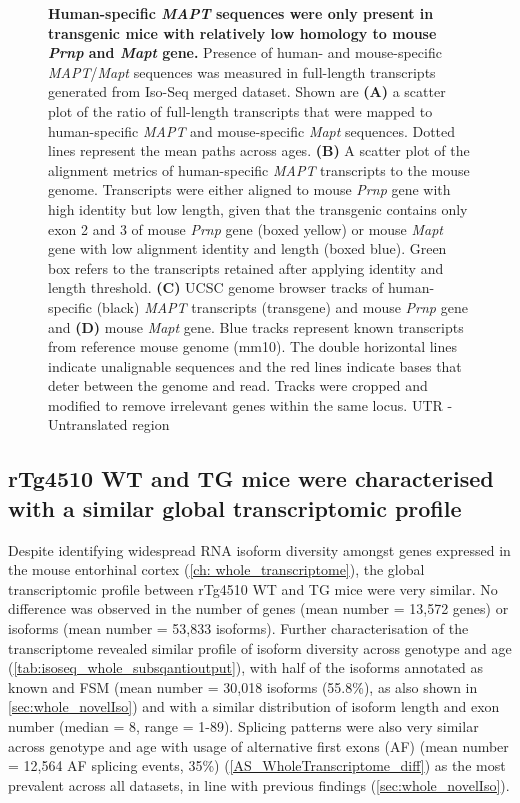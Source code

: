 \begin{figure}[htp]
	{\textbf{Human-specific \textit{MAPT} sequences were only present in transgenic mice with relatively low homology to mouse \textit{Prnp} and \textit{Mapt} gene.} Presence of human- and mouse-specific \textit{MAPT}/\textit{Mapt} sequences was measured in full-length transcripts generated from Iso-Seq merged dataset. Shown are \textbf{(A)} a scatter plot of the ratio of full-length transcripts that were mapped to human-specific \textit{MAPT} and mouse-specific \textit{Mapt} sequences. Dotted lines represent the mean paths across ages. \textbf{(B)} A scatter plot of the alignment metrics of human-specific \textit{MAPT} transcripts to the mouse genome. Transcripts were either aligned to mouse \textit{Prnp} gene with high identity but low length, given that the transgenic contains only exon 2 and 3 of mouse \textit{Prnp} gene\cite{Ramsden2005} (boxed yellow) or mouse \textit{Mapt} gene with low alignment identity and length (boxed blue). Green box refers to the transcripts retained after applying identity and length threshold. \textbf{(C)} UCSC genome browser tracks of human-specific (black) \textit{MAPT} transcripts (transgene) and mouse \textit{Prnp} gene and \textbf{(D)} mouse \textit{Mapt} gene. Blue tracks represent known transcripts from reference mouse genome (mm10). The double horizontal lines indicate unalignable sequences and the red lines indicate bases that deter between the genome and read. Tracks were cropped and modified to remove irrelevant genes within the same locus.  UTR - Untranslated region}
	\label{fig:isoseq_humanmapt}
\end{figure}

\clearpage
\subsection{rTg4510 WT and TG mice were characterised with a similar global transcriptomic profile}
Despite identifying widespread RNA isoform diversity amongst genes expressed in the mouse entorhinal cortex (\cref{ch: whole_transcriptome}), the global transcriptomic profile between rTg4510 WT and TG mice were very similar. No difference was observed in the number of genes (mean number = 13,572 genes) or isoforms (mean number = 53,833 isoforms). Further characterisation of the transcriptome revealed similar profile of isoform diversity across genotype and age (\cref{tab:isoseq_whole_subsqantioutput}), with half of the isoforms annotated as known and FSM (mean number = 30,018 isoforms (55.8\%), as also shown in \cref{sec:whole_novelIso}) and with a similar distribution of isoform length and exon number (median = 8, range = 1-89). Splicing patterns were also very similar across genotype and age with usage of alternative first exons (AF) (mean number = 12,564 AF splicing events, 35\%) (\cref{AS_WholeTranscriptome_diff}) as the most prevalent across all datasets, in line with previous findings (\cref{sec:whole_novelIso}).

